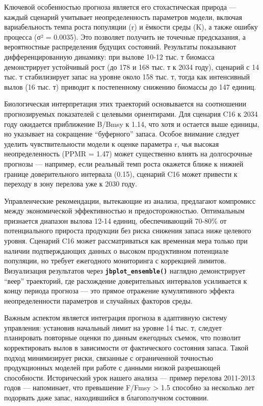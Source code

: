 \documentclass[
  letterpaper,
  DIV=11,
  numbers=noendperiod]{scrreprt}
\begin{document}
Ключевой особенностью прогноза является его стохастическая природа ---
каждый сценарий учитывает неопределенность параметров модели, включая
вариабельность темпа роста популяции (r) и ёмкости среды (K), а также
ошибку процесса (σ² = 0.0035). Это позволяет получить не точечные
предсказания, а вероятностные распределения будущих состояний.
Результаты показывают дифференцированную динамику: при вылове 10-12 тыс.
т биомасса демонстрирует устойчивый рост (до 178 и 168 тыс. т к 2034
году), сценарий с 14 тыс. т стабилизирует запас на уровне около 158 тыс.
т, тогда как интенсивный вылов (16 тыс. т) приводит к постепенному
снижению биомассы до 147 единиц.

Биологическая интерпретация этих траекторий основывается на соотношении
прогнозируемых показателей с целевыми ориентирами. Для сценария C16 к
2034 году ожидается приближение B/Bmsy к 1.14, что хотя и остается выше
единицы, но указывает на сокращение ``буферного'' запаса. Особое
внимание следует уделить чувствительности модели к оценке параметра r,
чья высокая неопределенность (PPMR = 1.47) может существенно влиять на
долгосрочные прогнозы --- например, если реальный темп роста окажется
ближе к нижней границе доверительного интервала (0.15), сценарий C16
может привести к переходу в зону перелова уже к 2030 году.

Управленческие рекомендации, вытекающие из анализа, предлагают
компромисс между экономической эффективностью и предосторожностью.
Оптимальным признается диапазон вылова 12-14 единиц, обеспечивающий
70-80\% от потенциального прироста продукции без риска снижения запаса
ниже целевого уровня. Сценарий C16 может рассматриваться как временная
мера только при наличии подтверждающих данных о высоком продуктивном
потенциале популяции, но требует ежегодного мониторинга с коррекцией
лимитов. Визуализация результатов через
\textbf{\texttt{jbplot\_ensemble()}} наглядно демонстрирует ``веер''
траекторий, где расхождение доверительных интервалов усиливается к концу
периода прогноза --- это прямое отражение кумулятивного эффекта
неопределенности параметров и случайных факторов среды.

Важным аспектом является интеграция прогноза в адаптивную систему
управления: установив начальный лимит на уровне 14 тыс. т, следует
планировать повторные оценки по данным ежегодных съемок, что позволит
корректировать вылов в зависимости от фактического состояния запаса.
Такой подход минимизирует риски, связанные с ограниченной точностью
продукционных моделей при работе с данными низкой разрешающей
способности. Исторический урок нашего анализа --- пример перелова
2011-2013 годов --- напоминает, что превышение F/Fmsy \textgreater{} 1.5
способно за несколько лет подорвать даже запас, находившийся в
благополучном состоянии.
\end{document}
